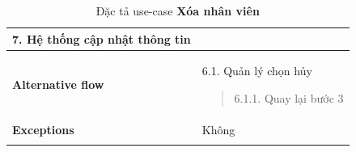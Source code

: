 {\begin{longtable}{| p{} | p{} |}
                    7. Hệ thống cập nhật thông tin
                \\
                \hline
                    \textbf{Alternative flow}
                &
                    6.1. Quản lý chọn hủy
                    \begin{quote}
                        6.1.1. Quay lại bước 3
                    \end{quote} 
                \\
                \hline
                    \textbf{Exceptions} 
                &
                    Không
                \\
                \hline
                \caption{Đặc tả use-case \textbf{Xóa nhân viên}}
            \end{longtable}
        }
    
 
